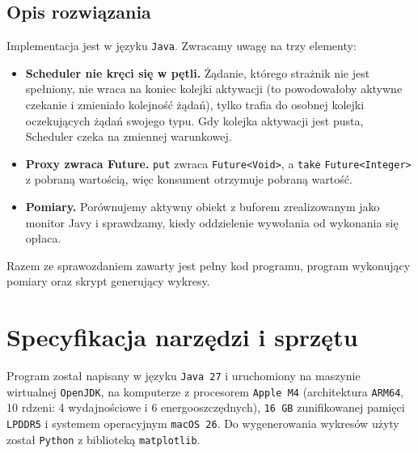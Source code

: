 \documentclass[11pt,a4paper]{article}
\begin{document}
\subsection{Opis rozwiązania}
Implementacja jest w języku \texttt{Java}. Zwracamy uwagę na trzy elementy:
\begin{itemize}
    \item \textbf{Scheduler nie kręci się w pętli.} Żądanie, którego strażnik nie jest spełniony,
          nie wraca na koniec kolejki aktywacji (to powodowałoby aktywne czekanie i zmieniało kolejność
          żądań), tylko trafia do osobnej kolejki oczekujących żądań swojego typu. Gdy kolejka
          aktywacji jest pusta, Scheduler czeka na zmiennej warunkowej.
    \item \textbf{Proxy zwraca Future.} \texttt{put} zwraca \texttt{Future<Void>}, a \texttt{take}
          \texttt{Future<Integer>} z pobraną wartością, więc konsument otrzymuje pobraną wartość.
    \item \textbf{Pomiary.} Porównujemy aktywny obiekt z buforem zrealizowanym jako monitor Javy
          i sprawdzamy, kiedy oddzielenie wywołania od wykonania się opłaca.
\end{itemize}
Razem ze sprawozdaniem zawarty jest pełny kod programu, program wykonujący pomiary
oraz skrypt generujący wykresy.

\section{Specyfikacja narzędzi i sprzętu}
Program został napisany w języku \texttt{Java 27} i uruchomiony na maszynie wirtualnej
\texttt{OpenJDK}, na komputerze z procesorem \texttt{Apple M4} (architektura \texttt{ARM64},
10 rdzeni: 4 wydajnościowe i 6 energooszczędnych), \texttt{16 GB} zunifikowanej pamięci
\texttt{LPDDR5} i systemem operacyjnym \texttt{macOS 26}.
Do wygenerowania wykresów użyty został \texttt{Python} z biblioteką \texttt{matplotlib}.
\end{document}

